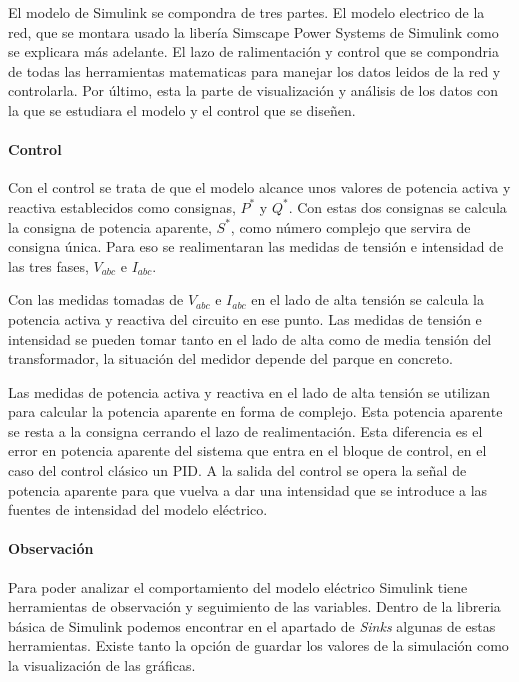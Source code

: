 \documentclass{book}
\begin{document}
El modelo de Simulink se compondra de tres partes. El modelo electrico de la red, que se montara usado la liber\'ia Simscape Power Systems de Simulink como se explicara m\'as adelante. El lazo de ralimentaci\'on y control que se compondria de todas las herramientas matematicas para manejar los datos leidos de la red y controlarla. Por \'ultimo, esta la parte de visualizaci\'on y an\'alisis de los datos con la que se estudiara el modelo y el control que se diseñen.   \par

		\paragraph{Control} 
Con el control se trata de que el modelo alcance unos valores de potencia activa y reactiva establecidos como consignas, $P^*$ y $Q^*$. Con estas dos consignas se calcula la consigna de potencia aparente, $S^*$, como n\'umero complejo que servira de consigna \'unica. Para eso se realimentaran las medidas de tensi\'on e intensidad de las tres fases, $V_{abc}$ e $I_{abc}$. \par

Con las medidas tomadas de $V_{abc}$ e $I_{abc}$ en el lado de alta tensi\'on se calcula la potencia activa y reactiva del circuito en ese punto. Las medidas de tensi\'on e intensidad se pueden tomar tanto en el lado de alta como de media tensi\'on del transformador, la situaci\'on del medidor depende del parque en concreto. \par

Las medidas de potencia activa y reactiva en el lado de alta tensi\'on se utilizan para calcular la potencia aparente en forma de complejo. Esta potencia aparente se resta a la consigna cerrando el lazo de realimentaci\'on. Esta diferencia es el error en potencia aparente del sistema que entra en el bloque de control, en el caso del control cl\'asico un PID. A la salida del control se opera la señal de potencia aparente para que vuelva a dar una intensidad que se introduce a las fuentes de intensidad del modelo el\'ectrico.  \par

		\paragraph{Observaci\'on}
Para poder analizar el comportamiento del modelo el\'ectrico Simulink tiene herramientas de observación y seguimiento de las variables. Dentro de la libreria b\'asica de Simulink podemos encontrar en el apartado de \emph{Sinks} algunas de estas herramientas. Existe tanto la opci\'on de guardar los valores de la simulaci\'on como la visualizaci\'on de las gr\'aficas. \par
\end{document}
